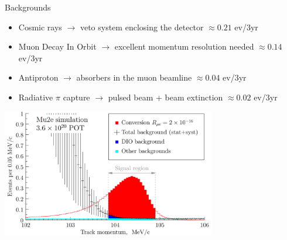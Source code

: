 \documentclass[10pt]{beamer}
\begin{document}
\begin{frame}{Backgrounds}
\begin{itemize}
\setlength\itemsep{0.2cm}
\item Cosmic rays $\rightarrow$ veto system enclosing the detector \hfill $\approx0.21$ ev/3yr
\item Muon Decay In Orbit $\rightarrow$ excellent momentum resolution needed \hfill $\approx0.14$ ev/3yr
\item Antiproton $\rightarrow$ absorbers in the muon beamline \hfill $\approx0.04$ ev/3yr
\item Radiative $\pi$ capture $\rightarrow$ pulsed beam + beam extinction \hfill $\approx0.02$ ev/3yr
\end{itemize}
\vspace{0.2cm}
\centering
\includegraphics[width=0.7\textwidth]{signal_bg}
\end{frame}
\end{document}
